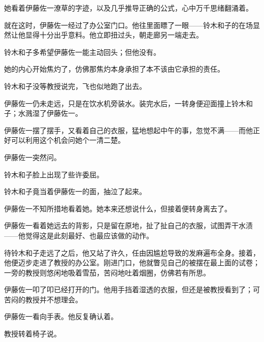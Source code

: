 她看着伊藤佐一潦草的字迹，以及几乎推导正确的公式，心中万千思绪翻涌着。

就在这时，伊藤佐一经过了办公室门口。他往里面瞟了一眼——铃木和子的在场显然让他显得十分出乎意料。他立即扭过头，朝走廊另一端走去。

铃木和子多希望伊藤佐一能主动回头；但他没有。

她的内心开始焦灼了，仿佛那焦灼本身承担了本不该由它承担的责任。




铃木和子没等教授说完，飞也似地跑了出去。

伊藤佐一仍未走远，只是在饮水机旁装水。装完水后，一转身便迎面撞上铃木和子；水溅湿了伊藤佐一。


伊藤佐一摆了摆手，又看着自己的衣服，猛地想起中午的事，忽觉不满——而他正好可以利用这个机会问她个一清二楚。


伊藤佐一突然问。

铃木和子脸上出现了些许委屈。



铃木和子竟当着伊藤佐一的面，抽泣了起来。

伊藤佐一不知所措地看着她。她本来还想说什么，但接着便转身离去了。

伊藤佐一看着她远去的背影，只是留在原地，扯了扯自己的衣服，试图弄干水渍——他觉得这是此刻最好、也最应该做的动作。

待铃木和子走远了之后，他又站了许久，任由因尴尬导致的发麻遍布全身。接着，他便迈步走进了教授的办公室。刚进门口，他就瞥见自己的被摆在最上面的试卷；一旁的教授则悠闲地吸着雪茄，苦闷地吐着烟圈，仿佛若有所思。

伊藤佐一叩了叩已经打开的门。他用手挡着湿透的衣服，但还是被教授看到了；可苦闷的教授并不想理会。


伊藤佐一看向手表。他反复确认着。

教授转着椅子说。

